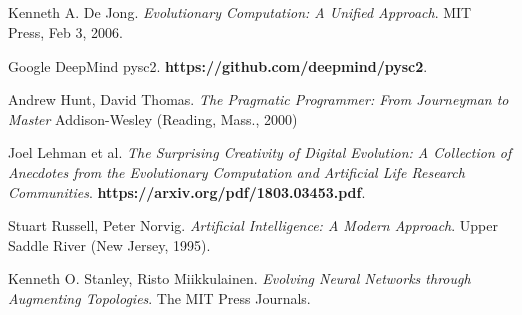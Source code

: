 \documentclass{article}
\begin{document}
\\~\\
\hline
\\~\\

\begin{thebibliography}{9}

  Kenneth A. De Jong.
  \textit{Evolutionary Computation: A Unified Approach}.
  MIT Press, Feb 3, 2006.

  Google DeepMind pysc2.
  \textbf{https://github.com/deepmind/pysc2}.

  Andrew Hunt, David Thomas.
  \textit{The Pragmatic Programmer: From Journeyman to Master}
  Addison-Wesley (Reading, Mass., 2000)

  Joel Lehman et al.
  \textit{The Surprising Creativity of Digital Evolution: A Collection of
    Anecdotes from the Evolutionary Computation and Artificial Life Research
    Communities}.
  \textbf{https://arxiv.org/pdf/1803.03453.pdf}.

  Stuart Russell, Peter Norvig.
  \textit{Artificial Intelligence: A Modern Approach}.
  Upper Saddle River (New Jersey, 1995).
  
  Kenneth O. Stanley, Risto Miikkulainen.
  \textit{Evolving Neural Networks through Augmenting Topologies}. 
  The MIT Press Journals.




\end{thebibliography}
\end{document}
